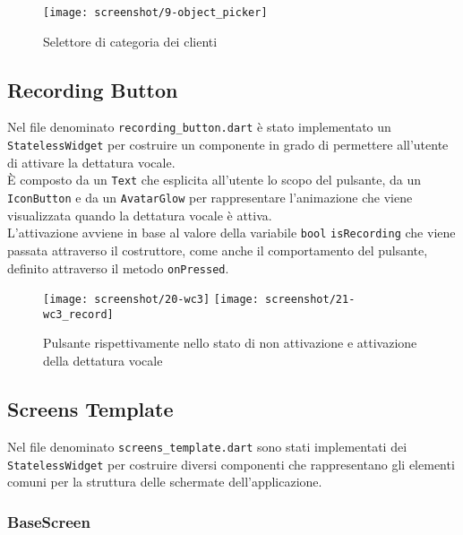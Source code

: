 \begin{figure}[!h] 
    \centering 
    \texttt{[image: screenshot/9-object\_picker]}
    \caption{Selettore di categoria dei clienti}
    \label{fig:object-picker}
\end{figure}

\subsection{Recording Button}
\label{subsec:recording-button}

Nel file denominato \lstinline{recording_button.dart} è stato implementato un \lstinline{StatelessWidget} per costruire un componente in grado di permettere all'utente di attivare la dettatura vocale.\\
È composto da un \lstinline{Text}\cite{site:text} che esplicita all'utente lo scopo del pulsante, da un \lstinline{IconButton}\cite{site:icon-button} e da un \lstinline{AvatarGlow}\cite{site:avatar-glow} per rappresentare l'animazione che viene visualizzata quando la dettatura vocale è attiva.\\
L'attivazione avviene in base al valore della variabile \lstinline{bool} \lstinline{isRecording} che viene passata attraverso il costruttore, come anche il comportamento del pulsante, definito attraverso il metodo \lstinline{onPressed}\cite{site:on-pressed}.

\begin{figure}[!h] 
    \centering 
    \texttt{[image: screenshot/20-wc3]}
    \hfill
    \texttt{[image: screenshot/21-wc3\_record]} 
    \caption{Pulsante rispettivamente nello stato di non attivazione e attivazione della dettatura vocale}
    \label{fig:record-button}
\end{figure}

\newpage

\subsection{Screens Template}
\label{subsec:screens-template}

Nel file denominato \lstinline{screens_template.dart} sono stati implementati dei \lstinline{StatelessWidget} per costruire diversi componenti che rappresentano gli elementi comuni per la struttura delle schermate dell'applicazione.

\subsubsection*{BaseScreen}
\label{subsubsec:base-screen}

